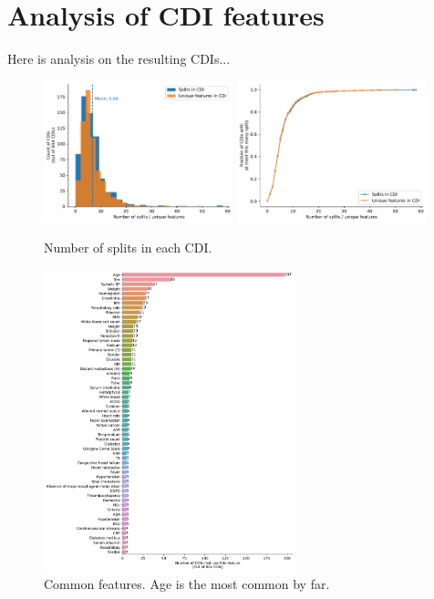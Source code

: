 \documentclass[10pt]{article}
\begin{document}
\section{Analysis of CDI features}

Here is analysis on the resulting CDIs...

\begin{figure}[H]
    \centering
    \includegraphics[width=0.49\textwidth]{../results/num_rules_hist.pdf}
    \includegraphics[width=0.49\textwidth]{../results/num_rules_cdf.pdf}
    \caption{Number of splits in each CDI.}
\end{figure}

\begin{figure}[H]
    \centering
    \includegraphics[width=0.65\textwidth]{../results/common_features.pdf}
    \caption{Common features. Age is the most common by far.}
\end{figure}
\end{document}
